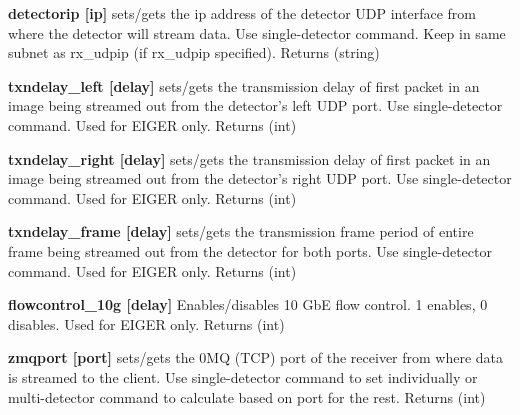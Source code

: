 \begin{DoxyItemize}
\item {\bfseries detectorip \mbox{[}ip\mbox{]}} sets/gets the ip address of the detector UDP interface from where the detector will stream data. Use single-\/detector command. Keep in same subnet as rx\_\-udpip (if rx\_\-udpip specified). {\ttfamily Returns} {\ttfamily }(string)
\end{DoxyItemize}


\begin{DoxyItemize}
\item {\bfseries txndelay\_\-left \mbox{[}delay\mbox{]}} sets/gets the transmission delay of first packet in an image being streamed out from the detector's left UDP port. Use single-\/detector command. Used for EIGER only. {\ttfamily Returns} {\ttfamily }(int)
\end{DoxyItemize}


\begin{DoxyItemize}
\item {\bfseries txndelay\_\-right \mbox{[}delay\mbox{]}} sets/gets the transmission delay of first packet in an image being streamed out from the detector's right UDP port. Use single-\/detector command. Used for EIGER only. {\ttfamily Returns} {\ttfamily }(int)
\end{DoxyItemize}


\begin{DoxyItemize}
\item {\bfseries txndelay\_\-frame \mbox{[}delay\mbox{]}} sets/gets the transmission frame period of entire frame being streamed out from the detector for both ports. Use single-\/detector command. Used for EIGER only. {\ttfamily Returns} {\ttfamily }(int)
\end{DoxyItemize}


\begin{DoxyItemize}
\item {\bfseries flowcontrol\_\-10g \mbox{[}delay\mbox{]}} Enables/disables 10 GbE flow control. 1 enables, 0 disables. Used for EIGER only. {\ttfamily Returns} {\ttfamily }(int)
\end{DoxyItemize}


\begin{DoxyItemize}
\item {\bfseries zmqport \mbox{[}port\mbox{]}} sets/gets the 0MQ (TCP) port of the receiver from where data is streamed to the client. Use single-\/detector command to set individually or multi-\/detector command to calculate based on {\ttfamily port} for the rest. {\ttfamily Returns} {\ttfamily }(int)
\end{DoxyItemize}


